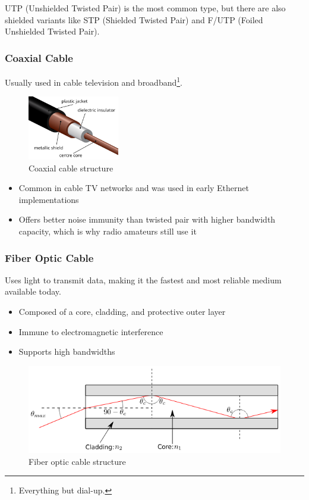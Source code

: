 UTP (Unshielded Twisted Pair) is the most common type, but there are also shielded variants like STP (Shielded Twisted Pair) and F/UTP (Foiled Unshielded Twisted Pair).

\vspace{1em}

\subsubsection*{Coaxial Cable}
Usually used in cable television and broadband\footnote{Everything but dial-up.}.

\begin{figure}[h]
    \centering
    \includegraphics[width=4cm]{assets/osi/physical/coax.png}
    \caption{Coaxial cable structure}\label{fig:coaxial_cable}
\end{figure}

\begin{itemize}
    \item Common in cable TV networks and was used in early Ethernet implementations
    \item Offers better noise immunity than twisted pair with higher bandwidth capacity, which is why radio amateurs still use it
\end{itemize}

\vspace{1em}

\newpage
\subsubsection*{Fiber Optic Cable}
Uses light to transmit data, making it the fastest and most reliable medium available today.

\begin{itemize}
    \item Composed of a core, cladding, and protective outer layer
    \item Immune to electromagnetic interference
    \item Supports high bandwidths
\end{itemize}

\begin{figure}
    \centering
    \includegraphics[width=.8\textwidth]{assets/osi/physical/fiber.png}
    \caption{Fiber optic cable structure}\label{fig:fiber_optic}
\end{figure}

